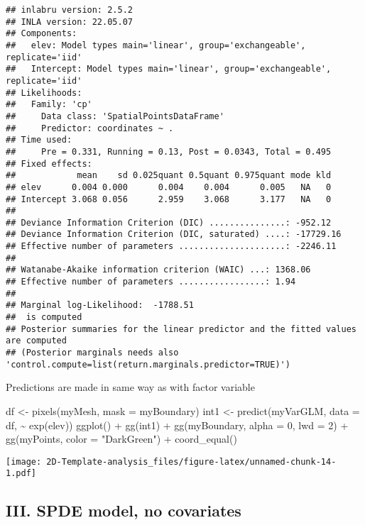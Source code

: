 \documentclass[
]{article}
\newenvironment{Shaded}{\begin{snugshade}}{\end{snugshade}}
\newcommand{\AttributeTok}[1]{\textcolor[rgb]{0.77,0.63,0.00}{#1}}
\newcommand{\DecValTok}[1]{\textcolor[rgb]{0.00,0.00,0.81}{#1}}
\newcommand{\FunctionTok}[1]{\textcolor[rgb]{0.00,0.00,0.00}{#1}}
\newcommand{\NormalTok}[1]{#1}
\newcommand{\OtherTok}[1]{\textcolor[rgb]{0.56,0.35,0.01}{#1}}
\newcommand{\SpecialCharTok}[1]{\textcolor[rgb]{0.00,0.00,0.00}{#1}}
\newcommand{\StringTok}[1]{\textcolor[rgb]{0.31,0.60,0.02}{#1}}
\begin{document}
\begin{verbatim}
## inlabru version: 2.5.2
## INLA version: 22.05.07
## Components:
##   elev: Model types main='linear', group='exchangeable', replicate='iid'
##   Intercept: Model types main='linear', group='exchangeable', replicate='iid'
## Likelihoods:
##   Family: 'cp'
##     Data class: 'SpatialPointsDataFrame'
##     Predictor: coordinates ~ .
## Time used:
##     Pre = 0.331, Running = 0.13, Post = 0.0343, Total = 0.495 
## Fixed effects:
##            mean    sd 0.025quant 0.5quant 0.975quant mode kld
## elev      0.004 0.000      0.004    0.004      0.005   NA   0
## Intercept 3.068 0.056      2.959    3.068      3.177   NA   0
## 
## Deviance Information Criterion (DIC) ...............: -952.12
## Deviance Information Criterion (DIC, saturated) ....: -17729.16
## Effective number of parameters .....................: -2246.11
## 
## Watanabe-Akaike information criterion (WAIC) ...: 1368.06
## Effective number of parameters .................: 1.94
## 
## Marginal log-Likelihood:  -1788.51 
##  is computed 
## Posterior summaries for the linear predictor and the fitted values are computed
## (Posterior marginals needs also 'control.compute=list(return.marginals.predictor=TRUE)')
\end{verbatim}

Predictions are made in same way as with factor variable

\begin{Shaded}
\begin{Highlighting}[]
\NormalTok{df }\OtherTok{\textless{}{-}} \FunctionTok{pixels}\NormalTok{(myMesh, }\AttributeTok{mask =}\NormalTok{ myBoundary)}
\NormalTok{int1 }\OtherTok{\textless{}{-}} \FunctionTok{predict}\NormalTok{(myVarGLM, }\AttributeTok{data =}\NormalTok{ df, }\SpecialCharTok{\textasciitilde{}} \FunctionTok{exp}\NormalTok{(elev))}
\FunctionTok{ggplot}\NormalTok{() }\SpecialCharTok{+}
  \FunctionTok{gg}\NormalTok{(int1) }\SpecialCharTok{+}
  \FunctionTok{gg}\NormalTok{(myBoundary, }\AttributeTok{alpha =} \DecValTok{0}\NormalTok{, }\AttributeTok{lwd =} \DecValTok{2}\NormalTok{) }\SpecialCharTok{+}
  \FunctionTok{gg}\NormalTok{(myPoints, }\AttributeTok{color =} \StringTok{"DarkGreen"}\NormalTok{) }\SpecialCharTok{+}
  \FunctionTok{coord\_equal}\NormalTok{()}
\end{Highlighting}
\end{Shaded}

\texttt{[image: 2D-Template-analysis\_files/figure-latex/unnamed-chunk-14-1.pdf]}

\hypertarget{iii.-spde-model-no-covariates}{%
\subsection{III. SPDE model, no
covariates}\label{iii.-spde-model-no-covariates}}
\end{document}
